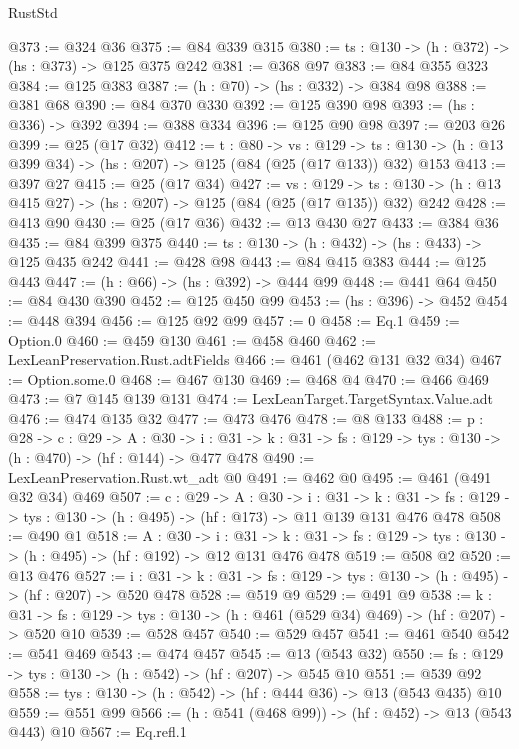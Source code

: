\begin{lexlean}{RustStd}
\begin{coremodule}
@373 := @324 @36
@375 := @84 @339 @315
@380 := {ts : @130} -> (h : @372) -> (hs : @373) -> @125 @375 @242
@381 := @368 @97
@383 := @84 @355 @323
@384 := @125 @383
@387 := (h : @70) -> (hs : @332) -> @384 @98
@388 := @381 @68
@390 := @84 @370 @330
@392 := @125 @390 @98
@393 := (hs : @336) -> @392
@394 := @388 @334
@396 := @125 @90 @98
@397 := @203 @26
@399 := @25 (@17 @32)
@412 := {t : @80} ->
  {vs : @129} ->
  {ts : @130} -> (h : @13 @399 @34) -> (hs : @207) -> @125 (@84 (@25 (@17 @133)) @32) @153
@413 := @397 @27
@415 := @25 (@17 @34)
@427 := {vs : @129} ->
  {ts : @130} -> (h : @13 @415 @27) -> (hs : @207) -> @125 (@84 (@25 (@17 @135)) @32) @242
@428 := @413 @90
@430 := @25 (@17 @36)
@432 := @13 @430 @27
@433 := @384 @36
@435 := @84 @399 @375
@440 := {ts : @130} -> (h : @432) -> (hs : @433) -> @125 @435 @242
@441 := @428 @98
@443 := @84 @415 @383
@444 := @125 @443
@447 := (h : @66) -> (hs : @392) -> @444 @99
@448 := @441 @64
@450 := @84 @430 @390
@452 := @125 @450 @99
@453 := (hs : @396) -> @452
@454 := @448 @394
@456 := @125 @92 @99
@457 := 0
@458 := Eq.{1}
@459 := Option.{0}
@460 := @459 @130
@461 := @458 @460
@462 := LexLeanPreservation.Rust.adtFields
@466 := @461 (@462 @131 @32 @34)
@467 := Option.some.{0}
@468 := @467 @130
@469 := @468 @4
@470 := @466 @469
@473 := @7 @145 @139 @131
@474 := LexLeanTarget.TargetSyntax.Value.adt
@476 := @474 @135 @32
@477 := @473 @476
@478 := @8 @133
@488 := {p : @28} ->
  {c : @29} ->
  {A : @30} ->
  {i : @31} -> {k : @31} -> {fs : @129} -> {tys : @130} -> (h : @470) -> (hf : @144) -> @477 @478
@490 := LexLeanPreservation.Rust.wt_adt @0
@491 := @462 @0
@495 := @461 (@491 @32 @34) @469
@507 := {c : @29} ->
  {A : @30} ->
  {i : @31} ->
  {k : @31} -> {fs : @129} -> {tys : @130} -> (h : @495) -> (hf : @173) -> @11 @139 @131 @476 @478
@508 := @490 @1
@518 := {A : @30} ->
  {i : @31} ->
  {k : @31} -> {fs : @129} -> {tys : @130} -> (h : @495) -> (hf : @192) -> @12 @131 @476 @478
@519 := @508 @2
@520 := @13 @476
@527 := {i : @31} ->
  {k : @31} -> {fs : @129} -> {tys : @130} -> (h : @495) -> (hf : @207) -> @520 @478
@528 := @519 @9
@529 := @491 @9
@538 := {k : @31} ->
  {fs : @129} -> {tys : @130} -> (h : @461 (@529 @34) @469) -> (hf : @207) -> @520 @10
@539 := @528 @457
@540 := @529 @457
@541 := @461 @540
@542 := @541 @469
@543 := @474 @457
@545 := @13 (@543 @32)
@550 := {fs : @129} -> {tys : @130} -> (h : @542) -> (hf : @207) -> @545 @10
@551 := @539 @92
@558 := {tys : @130} -> (h : @542) -> (hf : @444 @36) -> @13 (@543 @435) @10
@559 := @551 @99
@566 := (h : @541 (@468 @99)) -> (hf : @452) -> @13 (@543 @443) @10
@567 := Eq.refl.{1}

\end{coremodule}
\end{lexlean}

